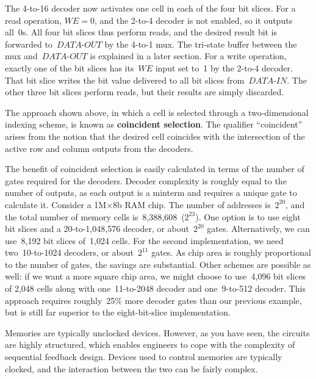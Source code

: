 The \mbox{4-to-16} decoder now activates one cell in each of the four 
bit slices.  For a read operation, $WE=0$, and the \mbox{2-to-4} decoder 
is not enabled, so it outputs all~0s.  All four bit slices thus perform
reads, and the desired result bit is forwarded to~\mbox{$DATA$-$OUT$} by the 
\mbox{4-to-1} mux.  The tri-state buffer between the mux 
and~\mbox{$DATA$-$OUT$} is explained in a later section.
%
For a write operation, exactly one of the bit
slices has its~$WE$ input set to~1 by the \mbox{2-to-4} decoder.
That bit slice writes the bit value delivered to all bit slices
from~\mbox{$DATA$-$IN$}.  The other three bit slices perform reads, but their 
results are simply discarded.

The approach shown above, in which a cell is selected
through a two-dimensional indexing scheme, is known as {\bf coincident
selection}.  The qualifier ``coincident'' arises from the notion that
the desired cell coincides with the intersection of the active row and
column outputs from the decoders.

The benefit of coincident selection is easily calculated in terms of
the number of gates required for the decoders.  Decoder complexity is
roughly equal to the number of outputs, as each output is a minterm
and requires a unique gate to calculate it.  
%
%
Consider a 1M$\times$8b RAM chip.  The number of addresses is~$2^{20}$,
and the total number of memory cells is~8,388,608~($2^{23}$).
One option is to use eight bit slices and a \mbox{20-to-1,048,576}
decoder, or about~$2^{20}$ gates.  Alternatively, we can use~8,192 bit
slices of~1,024 cells.  For the second implementation, we need 
two~\mbox{10-to-1024} decoders, or about~$2^{11}$ gates.  As chip 
area is roughly proportional to the number of gates, the savings are 
substantial.  Other schemes are possible as well: if we want a more 
square chip area, we might choose to use~4,096 bit slices of 2,048 
cells along with one~\mbox{11-to-2048} decoder and
one~\mbox{9-to-512} decoder.  This approach requires roughly~25\% more
decoder gates than our previous example, but is still far superior to
the eight-bit-slice implementation.

Memories are typically unclocked devices.  However, as you have seen,
the circuits are highly structured, which enables engineers to cope
with the complexity of sequential feedback design.  Devices used to
control memories are typically clocked, and the interaction between
the two can be fairly complex.  

